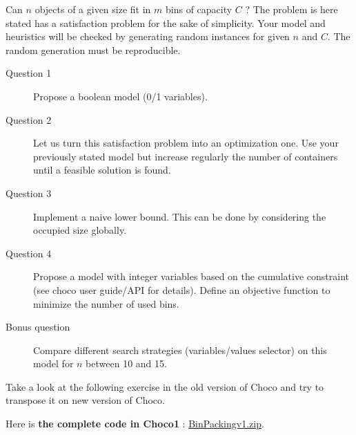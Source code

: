 Can $n$ objects of a given size fit in $m$ bins of capacity $C$ ? The problem is here stated has a satisfaction problem for the sake of simplicity. Your model and heuristics will be checked by generating random instances for given $n$ and $C$. The random generation must be reproducible.
\begin{description}
	\item[Question 1] Propose a boolean model (0/1 variables).
	\item[Question 2] Let us turn this satisfaction problem into an optimization one. Use your previously stated model but increase regularly the number of containers until a feasible solution is found.
	\item[Question 3] Implement a naive lower bound. This can be done by considering the occupied size globally.
	\item[Question 4] Propose a model with integer variables based on the cumulative constraint (see choco user guide/API for details). Define an objective function to minimize the number of used bins.
	\item[Bonus question] Compare different search strategies (variables/values selector) on this model for $n$ between 10 and 15.
\end{description}

Take a look at the following exercise in the old version of Choco and try to transpose it on new version of Choco.

Here is \textbf{the complete code in Choco1} : \href{media/zip/binpackingv1.zip}{BinPackingv1.zip}.

